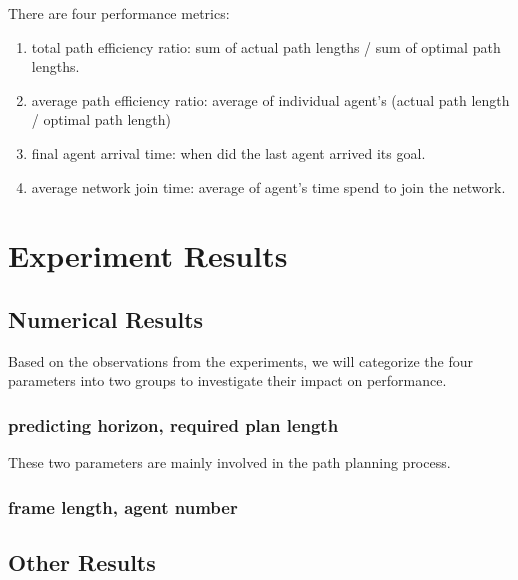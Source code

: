 There are four performance metrics:
\begin{enumerate}
    \item total path efficiency ratio: sum of actual path lengths / sum of optimal path lengths.
    \item average path efficiency ratio: average of individual agent's (actual path length / optimal path length)
    \item final agent arrival time: when did the last agent arrived its goal.
    \item average network join time: average of agent's time spend to join the network.
\end{enumerate}

\section{Experiment Results}
\subsection{Numerical Results}
Based on the observations from the experiments, we will categorize the four parameters into two groups to investigate their impact on performance.

\subsubsection{predicting horizon, required plan length}

These two parameters are mainly involved in the path planning process. 

\subsubsection{frame length, agent number}

\subsection{Other Results}
